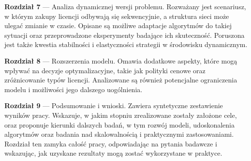 \begin{description}
    \item \textbf{Rozdział 7} --- Analiza dynamicznej wersji problemu. Rozważany jest scenariusz, w którym zakupy licencji odbywają się sekwencyjnie, a struktura sieci może ulegać zmianie w czasie. Opisane są możliwe adaptacje algorytmów do takiej sytuacji oraz przeprowadzone eksperymenty badające ich skuteczność. Poruszona jest także kwestia stabilności i elastyczności strategii w środowisku dynamicznym.

    \item \textbf{Rozdział 8} --- Rozszerzenia modelu. Omawia dodatkowe aspekty, które mogą wpływać na decyzje optymalizacyjne, takie jak polityki cenowe oraz zróżnicowanie typów licencji. Analizowane są również potencjalne ograniczenia modelu i możliwości jego dalszego uogólnienia.

    \item \textbf{Rozdział 9} --- Podsumowanie i wnioski. Zawiera syntetyczne zestawienie wyników pracy. Wskazuje, w jakim stopniu zrealizowane zostały założone cele, oraz proponuje kierunki dalszych badań, w tym rozwój modeli, udoskonalenia algorytmów oraz badania nad skalowalnością i praktycznymi zastosowaniami. Rozdział ten zamyka całość pracy, odpowiadając na pytania badawcze i wskazując, jak uzyskane rezultaty mogą zostać wykorzystane w praktyce.
\end{description}
